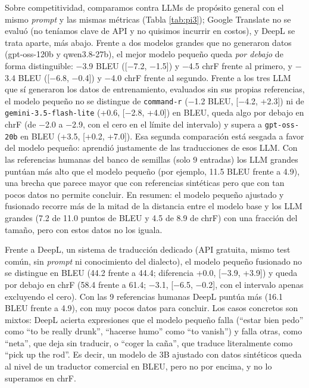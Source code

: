\documentclass[11pt,a4paper]{article}
\begin{document}
Sobre competitividad, comparamos contra LLMs de propósito general con el mismo \textit{prompt} y las mismas métricas (Tabla \ref{tab:pi3}); Google Translate no se evaluó (no teníamos clave de API y no quisimos incurrir en costos), y DeepL se trata aparte, más abajo. Frente a dos modelos grandes que no generaron datos (gpt-oss-120b y qwen3.8-27b), el mejor modelo pequeño queda \emph{por debajo} de forma distinguible: $-$3.9 BLEU ([$-$7.2, $-$1.5]) y $-$4.5 chrF frente al primero, y $-$3.4 BLEU ([$-$6.8, $-$0.4]) y $-$4.0 chrF frente al segundo. Frente a los tres LLM que sí generaron los datos de entrenamiento, evaluados sin sus propias referencias, el modelo pequeño no se distingue de \texttt{command-r} ($-$1.2 BLEU, [$-$4.2, +2.3]) ni de \texttt{gemini-3.5-flash-lite} (+0.6, [$-$2.8, +4.0]) en BLEU, queda algo por debajo en chrF (de $-$2.0 a $-$2.9, con el cero en el límite del intervalo) y supera a \texttt{gpt-oss-20b} en BLEU (+3.5, [+0.2, +7.0]). Esa segunda comparación está sesgada a favor del modelo pequeño: aprendió justamente de las traducciones de esos LLM. Con las referencias humanas del banco de semillas (solo 9 entradas) los LLM grandes puntúan más alto que el modelo pequeño (por ejemplo, 11.5 BLEU frente a 4.9), una brecha que parece mayor que con referencias sintéticas pero que con tan pocos datos no permite concluir. En resumen: el modelo pequeño ajustado y fusionado recorre más de la mitad de la distancia entre el modelo base y los LLM grandes (7.2 de 11.0 puntos de BLEU y 4.5 de 8.9 de chrF) con una fracción del tamaño, pero con estos datos no los iguala.

Frente a DeepL, un sistema de traducción dedicado (API gratuita, mismo test común, sin \textit{prompt} ni conocimiento del dialecto), el modelo pequeño fusionado no se distingue en BLEU (44.2 frente a 44.4; diferencia +0.0, [$-$3.9, +3.9]) y queda por debajo en chrF (58.4 frente a 61.4; $-$3.1, [$-$6.5, $-$0.2], con el intervalo apenas excluyendo el cero). Con las 9 referencias humanas DeepL puntúa más (16.1 BLEU frente a 4.9), con muy pocos datos para concluir. Los casos concretos son mixtos: DeepL acierta expresiones que el modelo pequeño falla (``estar bien pedo'' como ``to be really drunk'', ``hacerse humo'' como ``to vanish'') y falla otras, como ``neta'', que deja sin traducir, o ``coger la caña'', que traduce literalmente como ``pick up the rod''. Es decir, un modelo de 3B ajustado con datos sintéticos queda al nivel de un traductor comercial en BLEU, pero no por encima, y no lo superamos en chrF.
\end{document}
